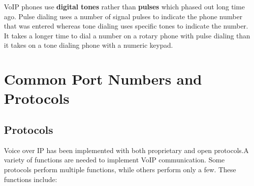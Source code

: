 \documentclass[a4paper,12pt]{book}
\begin{document}


VoIP phones use \textbf{digital tones} rather than \textbf{pulses} which phased out long time ago. Pulse dialing uses a number of signal pulses to indicate the phone number that was entered whereas tone dialing uses specific tones to indicate the number. It takes a longer time to dial a number on a rotary phone with pulse dialing than it takes on a tone dialing phone with a numeric keypad.


\section{Common Port Numbers and Protocols}

\subsection{Protocols}
Voice over IP has been implemented with both proprietary and open protocols.A variety of functions are needed to implement VoIP communication. Some protocols perform multiple functions, while others perform only a few. These functions include:
\end{document}
